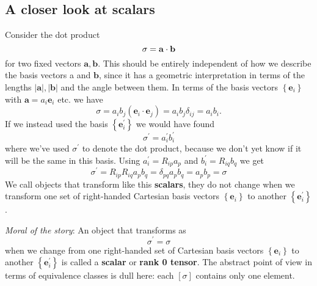 \subsection{A closer look at scalars}
Consider the dot product
\[
    \sigma={\bf a} \cdot {\bf b}
\]
for two fixed vectors $\mathbf{a}, \mathbf{b}$. This should be entirely independent of how we describe the basis vectors a and $\mathbf{b}$, since it has a geometric interpretation in terms of the lengths $|\mathbf{a}|,|\mathbf{b}|$ and the angle between them. In terms of the basis vectors $\left\{\mathbf{e}_{i}\right\}$ with $\mathbf{a}=a_{i} \mathbf{e}_{i}$ etc. we have
\[
\sigma=a_{i} b_{j}\left(\mathbf{e}_{i} \cdot \mathbf{e}_{j}\right)=a_{i} b_{j} \delta_{i j}=a_{i} b_{i}.
\]
If we instead used the basis $\left\{\mathbf{e}_{i}^{\prime}\right\}$ we would have found
\[
\sigma^{\prime}=a_{i}^{\prime} b_{i}^{\prime}
\]
where we've used $\sigma^{\prime}$ to denote the dot product, because we don't yet know if it will be the same in this basis. Using $a_{i}^{\prime}=R_{i p} a_{p}$ and $b_{i}^{\prime}=R_{i q} b_{q}$ we get
\[
\sigma^{\prime}=R_{i p} R_{i q} a_{p} b_{q}=\delta_{p q} a_{p} b_{q}=a_{p} b_{p}=\sigma
\]
We call objects that transform like this \textbf{scalars}, they do not change when we transform one set of right-handed Cartesian basis vectors $\left\{\mathbf{e}_{i}\right\}$ to another $\left\{\mathbf{e}_{i}^{\prime}\right\}$. 

\textit{Moral of the story}: An object that transforms as
\[
    \boxed{\sigma^{\prime}=\sigma}
\]
when we change from one right-handed set of Cartesian basis vectors $\left\{\mathbf{e}_{i}\right\}$ to another $\left\{\mathbf{e}_{i}^{\prime}\right\}$ is called a \textbf{scalar} or \textbf{rank 0 tensor}. The abstract point of view in terms of equivalence classes is dull here: each $[\sigma]$ contains only one element.

